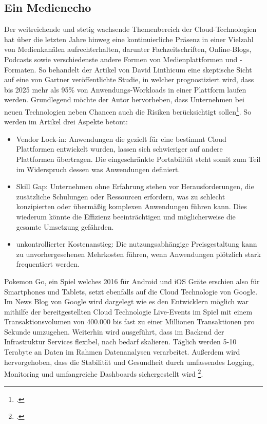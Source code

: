 \subsection{Ein Medienecho}\label{lab:medienecho}
Der weitreichende und stetig wachsende Themenbereich der Cloud-Technologien hat über die letzten Jahre hinweg eine kontinuierliche Präsenz in einer Vielzahl von Medienkanälen aufrechterhalten, darunter Fachzeitschriften, Online-Blogs, Podcasts sowie verschiedenste andere Formen von Medienplattformen und -Formaten. So behandelt der Artikel von David Linthicum eine skeptische Sicht auf eine von Gartner veröffentlichte Studie, in welcher prognostiziert wird, dass bis 2025 mehr als 95\% von Anwendungs-Workloads in einer \cn Plattform laufen werden. Grundlegend möchte der Autor hervorheben, dass Unternehmen bei neuen Technologien neben Chancen auch die Risiken berücksichtigt sollen\footcite[Vgl.][o.S.]{compWoche}. So werden im Artikel drei Aspekte betont:
\begin{itemize}
	\item Vendor Lock-in: Anwendungen die gezielt für eine bestimmt Cloud Plattformen entwickelt wurden, lassen sich schwieriger auf andere Plattformen übertragen. Die eingeschränkte Portabilität steht somit zum Teil im Widerspruch dessen was \cn Anwendungen definiert.
	\item Skill Gap: Unternehmen ohne Erfahrung stehen vor Herausforderungen, die zusätzliche Schulungen oder Ressourcen erfordern, was zu schlecht konzipierten oder übermäßig komplexen Anwendungen führen kann. Dies wiederum könnte die Effizienz beeinträchtigen und möglicherweise die gesamte Umsetzung gefährden.
	\item unkontrollierter Kostenanstieg: Die nutzungsabhängige Preisgestaltung kann zu unvorhergesehenen Mehrkosten führen, wenn Anwendungen plötzlich stark frequentiert werden. 
\end{itemize}

Pokemon Go, ein Spiel welches 2016 für Android und iOS Gräte erschien also für Smartphones und Tablets, setzt ebenfalls auf die Cloud Technologie von Google. Im News Blog von Google wird dargelegt wie es den Entwicklern möglich war mithilfe der bereitgestellten Cloud Technologie Live-Events im Spiel mit einem Transaktionsvolumen von 400.000 bis fast zu einer Millionen Transaktionen pro Sekunde umzugehen. Weiterhin wird ausgeführt, dass im Backend der Infrastruktur  Services flexibel, nach bedarf skalieren. Täglich werden 5-10 Terabyte an Daten im Rahmen Datenanalysen verarbeitet. Außerdem wird hervorgehoben, dass die Stabilität und Gesundheit durch umfassendes Logging, Monitoring und umfangreiche Dashboards sichergestellt wird \footcite[Vgl.][o.S.]{pokemonGo}.
